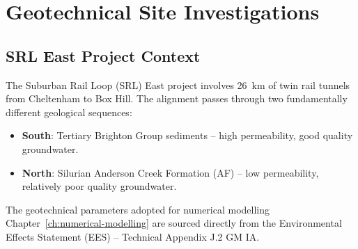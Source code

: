 \chapter{Geotechnical Site Investigations}
\label{ch:site-investigation}

\section{SRL East Project Context}
The Suburban Rail Loop (SRL) East project involves 26~km of twin rail tunnels from Cheltenham to Box Hill. The alignment passes through two fundamentally different geological sequences:

\begin{itemize}
 \item \textbf{South}: Tertiary Brighton Group sediments -- high permeability, good quality groundwater.
 \item \textbf{North}: Silurian Anderson Creek Formation (AF) -- low permeability, relatively poor quality groundwater.
\end{itemize}

The geotechnical parameters adopted for numerical modelling Chapter~\ref{ch:numerical-modelling} are sourced directly from the Environmental Effects Statement (EES) -- Technical Appendix J.2 GM IA.

